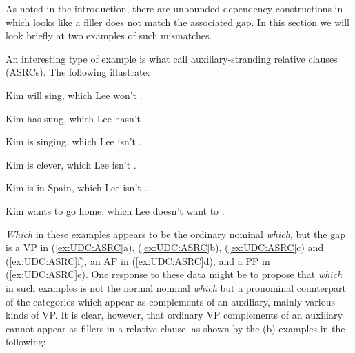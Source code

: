 \documentclass[output=paper
                ,modfonts
                ,nonflat
	        ,collection
	        ,collectionchapter
	        ,collectiontoclongg
 	        ,biblatex
                ,babelshorthands
                ,newtxmath
                ,draftmode
                ,colorlinks, citecolor=brown
]{./langsci/langscibook}
\begin{document}
{As noted in the introduction, there are unbounded dependency
constructions in which looks like a filler does not match the associated
gap. In this section we will look briefly at two examples of such
mismatches.

An interesting type of example is what \citet{Arnold:Borsley:10} call
auxiliary-stranding relative clauses (ASRCs). The following
illustrate:

\begin{exe}
  \ex \label{ex:UDC:ASRC}
  \begin{xlist}
    \ex Kim will sing, which Lee won't \gap{}.
    
    \ex Kim has sung, which Lee hasn't \gap{}.
    
    \ex Kim is singing, which Lee isn't \gap{}.
    
    \ex Kim is clever, which Lee isn't \gap{}.
    
    \ex Kim is in Spain, which Lee isn't \gap{}.
    
    \ex Kim wants to go home, which Lee doesn't want to \gap{}.
  \end{xlist}
\end{exe}

\noindent
\emph{Which} in these examples appears to be the ordinary nominal
\emph{which}, but the gap is a VP in (\ref{ex:UDC:ASRC}a), (\ref{ex:UDC:ASRC}b), (\ref{ex:UDC:ASRC}c) and (\ref{ex:UDC:ASRC}f), an AP in
(\ref{ex:UDC:ASRC}d), and a PP in (\ref{ex:UDC:ASRC}e). One response to these data might be to propose
that \emph{which} in such examples is not the normal nominal
\emph{which} but a pronominal counterpart of the categories which appear
as complements of an auxiliary, mainly various kinds of VP. It is clear,
however, that ordinary VP complements of an auxiliary cannot appear as
fillers in a relative clause, as shown by the (b) examples in the
following:

\begin{exe} \ex \begin{xlist} 

\end{xlist}
\end{exe}

\begin{exe} \ex \begin{xlist} 

\end{xlist}
\end{exe}
\noindent
\begin{exe} \ex \begin{xlist} 


\end{xlist}
\end{exe}}
\end{document}
